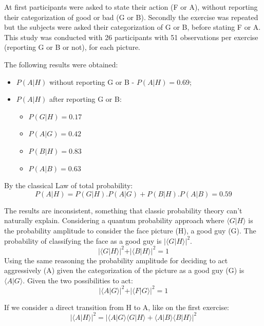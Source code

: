 At first participants were asked to state their action (F or A), without reporting their categorization of good or bad (G or B). Secondly the exercise was repeated but the subjects were asked their categorization of G or B, before stating F or A. This study was conducted with 26 participants with 51 observations per exercise (reporting G or B or not), for each picture.

The following results were obtained:
\begin{itemize}
\item $P(A\vert H)$ without reporting G or B - $P(A\vert H)=0.69$;

\item $P(A\vert H)$ after reporting G or B:
\begin{itemize}
\item $P(G\vert H) = 0.17$
\item $P(A\vert G) = 0.42$
\item $P(B \vert H) = 0.83$
\item $P(A\vert B) = 0.63$
\end{itemize}
\end{itemize}

By the classical Law of total probability:
\begin{equation}
P(A\vert H) = P(G\vert H).P(A\vert G) + P(B \vert H) . P(A\vert B) = 0.59
\end{equation}

The results are inconsistent, something that classic probability theory can't naturally explain.
Considering a quantum probability approach where $\langle G \vert H\rangle$ is the probability amplitude to consider the face picture (H), a good guy (G). The probability of classifying the face as a good guy is $\vert \langle G \vert H\rangle \vert ^{2}$.
 \begin{equation}
\vert \langle G \vert H\rangle \vert ^{2} + \vert \langle B \vert H\rangle \vert ^{2} = 1
\end{equation}
Using the same reasoning the probability amplitude for deciding to act aggressively (A) given the categorization of the picture as a good guy (G) is $\langle A \vert G\rangle$. Given the two possibilities to act:
 \begin{equation}
\vert \langle A \vert G\rangle \vert ^{2} + \vert \langle F \vert G\rangle \vert ^{2} = 1
\end{equation}

If we consider a direct transition from H to A, like on the first exercise:
 \begin{equation}
\label{eq:quantum_prob_b}
\vert \langle A \vert H\rangle \vert ^{2} = \vert 
 \langle A \vert G\rangle\langle G \vert H\rangle  + \langle A \vert B\rangle\langle B \vert H\rangle \vert^{2}
\end{equation}

